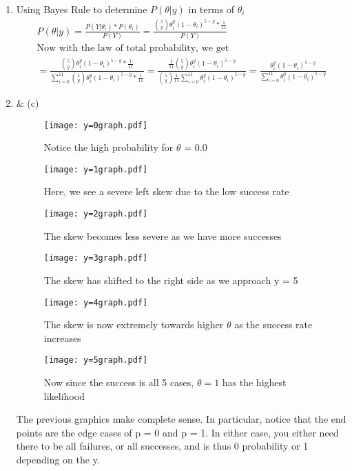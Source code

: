 \documentclass[11pt]{article}
\begin{document}
\begin{enumerate}
\begin{enumerate}
	\item Using Bayes Rule to determine $P(\theta | y)$ in terms of $\theta_i$
	\begin{gather}
		 P(\theta | y) = \frac{P(Y | \theta_i) * P(\theta_i)}{P(Y)} = \frac{\binom{5}{y} \theta_i^y(1-\theta_i)^{5-y} * \frac{1}{11}}{P(Y)}
		 \\
		 \text{Now with the law of total probability, we get}\\
		 = \frac{\binom{5}{y} \theta_i^y(1-\theta_i)^{5-y} * \frac{1}{11}}{\sum_{i=0}^{11}\binom{5}{y} \theta_i^y(1-\theta_i)^{5-y} * \frac{1}{11}} = \frac{\frac{1}{11}\binom{5}{y} \theta_i^y(1-\theta_i)^{5-y}}{\binom{5}{y} \frac{1}{11}\sum_{i=0}^{11} \theta_i^y(1-\theta_i)^{5-y}} = \frac{ \theta_i^y(1-\theta_i)^{5-y}}{\sum_{i=0}^{11} \theta_i^y(1-\theta_i)^{5-y}}
	\end{gather}
	\item \& (c)
	\begin{figure}[H]
		\centering
		\caption{Notice the high probability for $\theta$ = 0.0}
		\texttt{[image: y=0graph.pdf]}
	\end{figure}
	\begin{figure}[H]
		\centering
		\caption{Here, we see a severe left skew due to the low success rate}
		\texttt{[image: y=1graph.pdf]}
	\end{figure}
	\begin{figure}[H]
		\centering
		\caption{The skew becomes less severe as we have more successes}
		\texttt{[image: y=2graph.pdf]}
	\end{figure}
	\begin{figure}[H]
		\centering
		\caption{The skew has shifted to the right side as we approach y = 5}
		\texttt{[image: y=3graph.pdf]}
	\end{figure}
	\begin{figure}[H]
		\centering
		\caption{The skew is now extremely towards higher $\theta$ as the success rate increases}
		\texttt{[image: y=4graph.pdf]}
	\end{figure}
	\begin{figure}[H]
		\centering
		\caption{Now since the success is all 5 cases, $\theta=1$ has the highest likelihood}
		\texttt{[image: y=5graph.pdf]}
	\end{figure}
	The previous graphics make complete sense. In particular, notice that the end points are the edge cases of p = 0 and p = 1. In either case, you either need there to be all failures, or all successes, and is thus 0 probability or 1 depending on the y.

\end{enumerate}
\end{enumerate}
\end{document}
